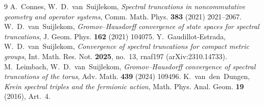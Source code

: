\documentclass[11pt]{article}
\theoremstyle{remark}
\begin{document}
\begin{thebibliography}{9}
 A.~Connes, W.~D.~van~Suijlekom,
\emph{Spectral truncations in noncommutative geometry and operator
systems}, Comm. Math. Phys. \textbf{383} (2021) 2021--2067.
 W.~D.~van~Suijlekom,
\emph{Gromov--Hausdorff convergence of state spaces for spectral
truncations}, J. Geom. Phys. \textbf{162} (2021) 104075.
 Y.~Gaudillot-Estrada, W.~D.~van~Suijlekom,
\emph{Convergence of spectral truncations for compact metric groups},
Int. Math. Res. Not. \textbf{2025}, no.~13, rnaf197
(arXiv:2310.14733).
 M.~Leimbach, W.~D.~van~Suijlekom,
\emph{Gromov--Hausdorff convergence of spectral truncations of the
torus}, Adv. Math. \textbf{439} (2024) 109496.
 K.~van~den~Dungen,
\emph{Krein spectral triples and the fermionic action},
Math. Phys. Anal. Geom. \textbf{19} (2016), Art.~4.
\end{thebibliography}
\end{document}
